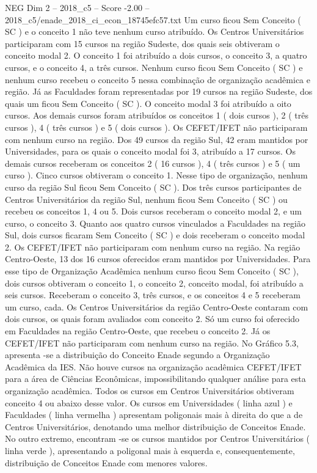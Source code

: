 \begin{textsample}{NEG Dim 2 – 2018\_c5 – Score -2.00 – 2018\_c5/enade\_2018\_ci\_econ\_18745efc57.txt}
Um curso ficou Sem Conceito ( SC ) e o conceito 1 não teve nenhum curso atribuído.
Os Centros Universitários participaram com 15 cursos na região Sudeste, dos quais seis obtiveram o conceito modal 2.
O conceito 1 foi atribuído a dois cursos, o conceito 3, a quatro cursos, e o conceito 4, a três cursos.
Nenhum curso ficou Sem Conceito ( SC ) e nenhum curso recebeu o conceito 5 nessa combinação de organização acadêmica e região.
Já as Faculdades foram representadas por 19 cursos na região Sudeste, dos quais um ficou Sem Conceito ( SC ).
O conceito modal 3 foi atribuído a oito cursos.
Aos demais cursos foram atribuídos os conceitos 1 ( dois cursos ), 2 ( três cursos ), 4 ( três cursos ) e 5 ( dois cursos ).
Os CEFET/IFET não participaram com nenhum curso na região.
Dos 49 cursos da região Sul, 42 eram mantidos por Universidades, para os quais o conceito modal foi 3, atribuído a 17 cursos.
Os demais cursos receberam os conceitos 2 ( 16 cursos ), 4 ( três cursos ) e 5 ( um curso ).
Cinco cursos obtiveram o conceito 1.
Nesse tipo de organização, nenhum curso da região Sul ficou Sem Conceito ( SC ).
Dos três cursos participantes de Centros Universitários da região Sul, nenhum ficou Sem Conceito ( SC ) ou recebeu os conceitos 1, 4 ou 5.
Dois cursos receberam o conceito modal 2, e um curso, o conceito 3.
Quanto aos quatro cursos vinculados a Faculdades na região Sul, dois cursos ficaram Sem Conceito ( SC ) e dois receberam o conceito modal 2.
Os CEFET/IFET não participaram com nenhum curso na região.
Na região Centro-Oeste, 13 dos 16 cursos oferecidos eram mantidos por Universidades.
Para esse tipo de Organização Acadêmica nenhum curso ficou Sem Conceito ( SC ), dois cursos obtiveram o conceito 1, o conceito 2, conceito modal, foi atribuído a seis cursos.
Receberam o conceito 3, três cursos, e os conceitos 4 e 5 receberam um curso, cada.
Os Centros Universitários da região Centro-Oeste contaram com dois cursos, os quais foram avaliados com conceito 2.
Só um curso foi oferecido em Faculdades na região Centro-Oeste, que recebeu o conceito 2.
Já os CEFET/IFET não participaram com nenhum curso na região.
No Gráfico 5.3, apresenta -se a distribuição do Conceito Enade segundo a Organização Acadêmica da IES.
Não houve cursos na organização acadêmica CEFET/IFET para a área de Ciências Econômicas, impossibilitando qualquer análise para esta organização acadêmica.
Todos os cursos em Centros Universitários obtiveram conceito 4 ou abaixo desse valor.
Os cursos em Universidades ( linha azul ) e Faculdades ( linha vermelha ) apresentam poligonais mais à direita do que a de Centros Universitários, denotando uma melhor distribuição de Conceitos Enade.
No outro extremo, encontram -se os cursos mantidos por Centros Universitários ( linha verde ), apresentando a poligonal mais à esquerda e, consequentemente, distribuição de Conceitos Enade com menores valores.

\end{textsample}
